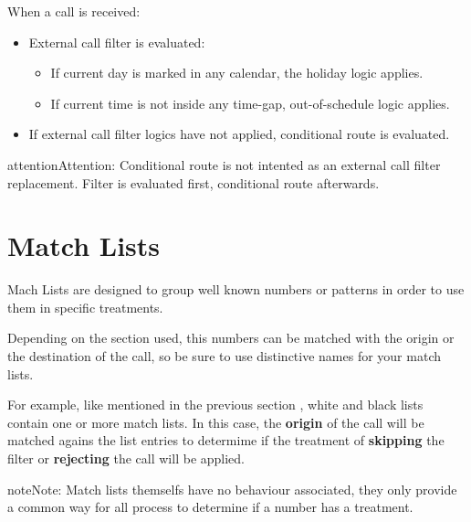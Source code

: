 \documentclass[letterpaper,10pt,english]{sphinxmanual}
\begin{document}
When a call is received:
\begin{itemize}
\item {} 
External call filter is evaluated:
\begin{itemize}
\item {} 
If current day is marked in any calendar, the holiday logic applies.

\item {} 
If current time is not inside any time-gap, out-of-schedule logic applies.

\end{itemize}

\item {} 
If external call filter logics have not applied, conditional route is evaluated.

\end{itemize}

\begin{notice}{attention}{Attention:}
Conditional route is not intented as an external call filter
replacement. Filter is evaluated first, conditional route afterwards.
\end{notice}


\section{Match Lists}
\label{company/match_lists:match-lists}\label{company/match_lists::doc}\label{company/match_lists:id1}
Mach Lists are designed to group well known numbers or patterns in order to use
them in specific treatments.

Depending on the section used, this numbers can be matched with the origin or
the destination of the call, so be sure to use distinctive names for your match
lists.

For example, like mentioned in the previous section {\hyperref[company/external_filters:external\string-filters]{}},
white and black lists contain one or more match lists. In this case, the
\textbf{origin} of the call will be matched agains the list entries to determime if
the treatment of \textbf{skipping} the filter or \textbf{rejecting} the call will be applied.

\begin{notice}{note}{Note:}
Match lists themselfs have no behaviour associated, they only provide
a common way for all process to determine if a number has a treatment.
\end{notice}
\end{document}
